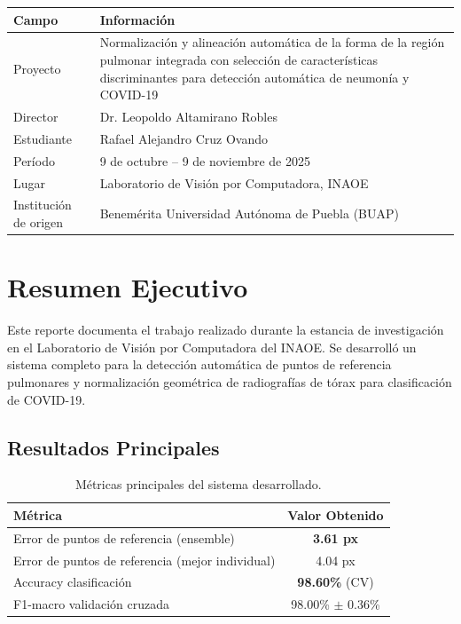 \documentclass[12pt,a4paper]{article}
\begin{document}
\begin{table}[H]
\centering
\begin{tabular}{p{4cm}p{10cm}}
\toprule
\textbf{Campo} & \textbf{Información} \\
\midrule
Proyecto & Normalización y alineación automática de la forma de la región pulmonar integrada con selección de características discriminantes para detección automática de neumonía y COVID-19 \\
Director & Dr. Leopoldo Altamirano Robles \\
Estudiante & Rafael Alejandro Cruz Ovando \\
Período & 9 de octubre -- 9 de noviembre de 2025 \\
Lugar & Laboratorio de Visión por Computadora, INAOE \\
Institución de origen & Benemérita Universidad Autónoma de Puebla (BUAP) \\
\bottomrule
\end{tabular}
\end{table}

\section{Resumen Ejecutivo}

Este reporte documenta el trabajo realizado durante la estancia de investigación en el Laboratorio de Visión por Computadora del INAOE. Se desarrolló un sistema completo para la detección automática de puntos de referencia pulmonares y normalización geométrica de radiografías de tórax para clasificación de COVID-19.

\subsection{Resultados Principales}

\begin{table}[H]
\centering
\begin{tabular}{lc}
\toprule
\textbf{Métrica} & \textbf{Valor Obtenido} \\
\midrule
Error de puntos de referencia (ensemble) & \textbf{3.61 px} \\
Error de puntos de referencia (mejor individual) & 4.04 px \\
Accuracy clasificación & \textbf{98.60\%} (CV) \\
F1-macro validación cruzada & 98.00\% $\pm$ 0.36\% \\
\bottomrule
\end{tabular}
\caption{Métricas principales del sistema desarrollado.}
\end{table}
\end{document}

